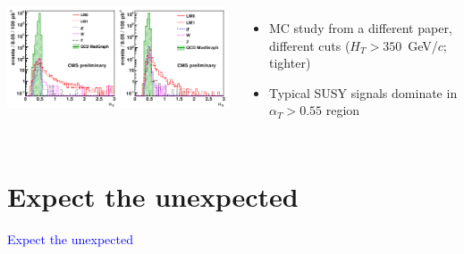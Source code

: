 \documentclass[compress]{beamer}
\begin{document}
\begin{frame}
\vspace{0.2 cm}
\begin{columns}
\includegraphics[width=\linewidth]{susy_mc.png}
\begin{itemize}
\item MC study from a different paper, different cuts {\scriptsize ($H_T > 350$~GeV/$c$; tighter)}
\item Typical SUSY signals dominate in $\alpha_T > 0.55$ region
\end{itemize}
\end{columns}
\end{frame}

\section*{Expect the unexpected}
\begin{frame}
\begin{center}
\Huge \textcolor{blue}{Expect the unexpected}
\end{center}
\end{frame}
\end{document}
